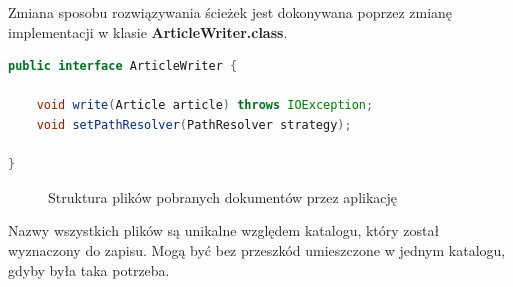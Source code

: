 Zmiana sposobu rozwiązywania ścieżek jest dokonywana poprzez zmianę implementacji w klasie \textbf{ArticleWriter.class}.

\begin{lstlisting}[language=Java,basicstyle=\small, style=javaStyle]
public interface ArticleWriter {

	void write(Article article) throws IOException;
	void setPathResolver(PathResolver strategy);

}
\end{lstlisting}



\begin{figure}[ht!]

\caption{Struktura plików pobranych dokumentów przez aplikację}
\label{fetched-files-strucutre}
\end{figure}

Nazwy wszystkich plików są unikalne względem katalogu, który został wyznaczony do zapisu. Mogą być bez przeszkód umieszczone w jednym katalogu, gdyby była taka potrzeba.
